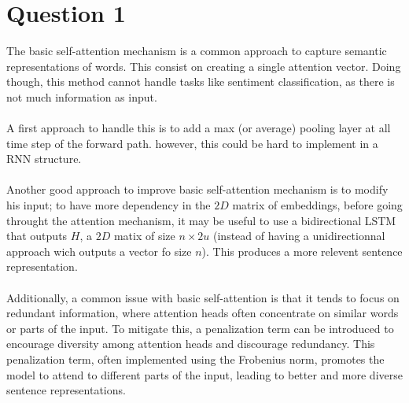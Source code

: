 \documentclass[a4paper]{article}
\begin{document}



\section{Question 1}

\noindent
The basic self-attention mechanism is a common approach to capture semantic representations of words. This consist on creating a single attention vector. Doing though, this method cannot handle tasks like sentiment classification, as there is not much information as input.
\\
\\
\noindent
A first approach to handle this is to add a max (or average) pooling layer at all time step of the forward path. however, this could be hard to implement in a RNN structure.
\\
\\
\noindent
Another good approach to improve basic self-attention mechanism is to 
modify his input; to have more dependency in the $2D$ matrix of embeddings, before going throught the attention mechanism, it may be useful to use a bidirectional LSTM that outputs $H$, a $2D$ matix of size $n \times 2u$ (instead of having a unidirectionnal approach wich outputs a vector fo size $n$). This produces a more relevent sentence representation.
\\
\\
\noindent
Additionally, a common issue with basic self-attention is that it tends to focus on redundant information, where attention heads often concentrate on similar words or parts of the input. To mitigate this, a penalization term can be introduced to encourage diversity among attention heads and discourage redundancy. This penalization term, often implemented using the Frobenius norm, promotes the model to attend to different parts of the input, leading to better and more diverse sentence representations.
\end{document}

